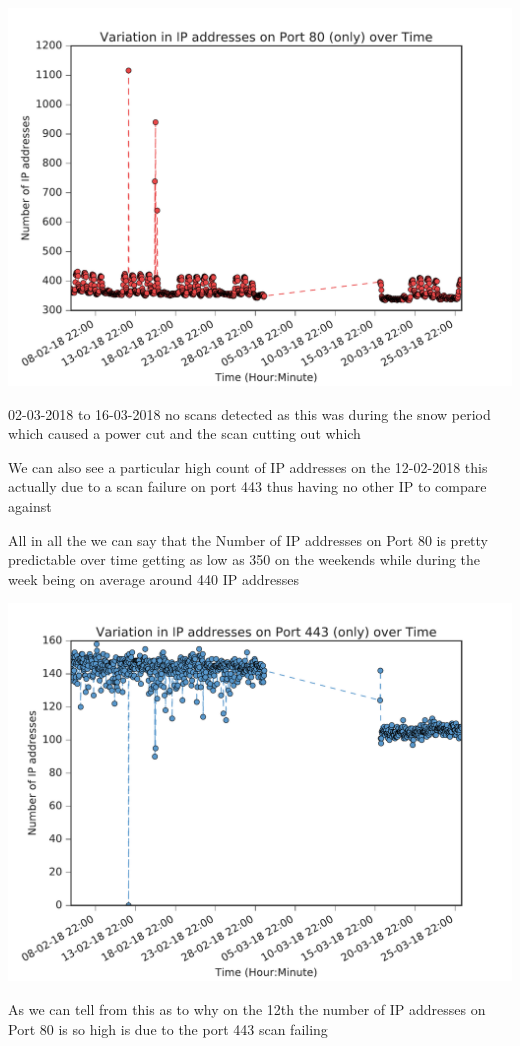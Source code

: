 \documentclass[a4wide,leqno,12pt]{report}
\begin{document}
\begin{center}
\includegraphics[scale=.5]{pdf_images/VariationInIpAddressesOnPort80OverTime}
\end{center}
02-03-2018  to 16-03-2018 no scans detected as this was during the snow period which caused a power cut and the scan cutting out which

We can also see a particular high count of IP addresses on the 12-02-2018 this actually due to a scan failure on port 443 thus having no other IP to compare against 

All in all the  we can say that the Number of IP addresses on Port 80 is pretty predictable over time getting as low as 350 on the weekends while during the week being on average around 440 IP addresses 
\begin{center}
\includegraphics[scale=.5]{pdf_images/VariationInIpAddressesOnPort443OverTime}
\end{center}
As we can tell from this as to why on the 12th the number of IP addresses on Port 80 is so high is due to the port 443 scan failing
\end{document}
